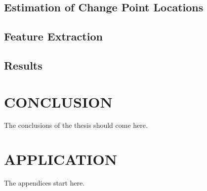 \documentclass[a4paper,onesided,12pt]{report}
\begin{document}
\section{Estimation of Change Point Locations}
\section{Feature Extraction}
\section{Results}

\chapter{CONCLUSION}
\label{chapter:conclusion}

The conclusions of the thesis should come
here.




\appendix
\chapter{APPLICATION}
The appendices start here.
\end{document}
